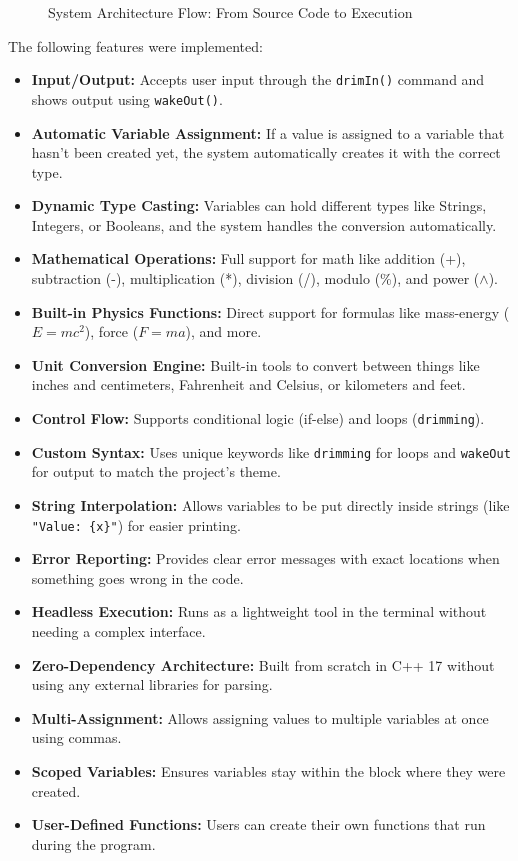 \documentclass[12pt, a4paper]{article}
\begin{document}
\begin{figure}[!h]
    \centering
    \caption{System Architecture Flow: From Source Code to Execution}
\end{figure}

The following features were implemented:
\begin{itemize}
    \item \textbf{Input/Output:} Accepts user input through the \texttt{drimIn()} command and shows output using \texttt{wakeOut()}.
    \item \textbf{Automatic Variable Assignment:} If a value is assigned to a variable that hasn't been created yet, the system automatically creates it with the correct type.
    \item \textbf{Dynamic Type Casting:} Variables can hold different types like Strings, Integers, or Booleans, and the system handles the conversion automatically.
    \item \textbf{Mathematical Operations:} Full support for math like addition (+), subtraction (-), multiplication (*), division (/), modulo (\%), and power ($\wedge$).
    \item \textbf{Built-in Physics Functions:} Direct support for formulas like mass-energy ($E=mc^2$), force ($F=ma$), and more.
    \item \textbf{Unit Conversion Engine:} Built-in tools to convert between things like inches and centimeters, Fahrenheit and Celsius, or kilometers and feet.
    \item \textbf{Control Flow:} Supports conditional logic (if-else) and loops (\texttt{drimming}).
    \item \textbf{Custom Syntax:} Uses unique keywords like \texttt{drimming} for loops and \texttt{wakeOut} for output to match the project's theme.
    \item \textbf{String Interpolation:} Allows variables to be put directly inside strings (like \texttt{"Value: \{x\}"}) for easier printing.
    \item \textbf{Error Reporting:} Provides clear error messages with exact locations when something goes wrong in the code.
    \item \textbf{Headless Execution:} Runs as a lightweight tool in the terminal without needing a complex interface.
    \item \textbf{Zero-Dependency Architecture:} Built from scratch in C++ 17 without using any external libraries for parsing.
    \item \textbf{Multi-Assignment:} Allows assigning values to multiple variables at once using commas.
    \item \textbf{Scoped Variables:} Ensures variables stay within the block where they were created.
    \item \textbf{User-Defined Functions:} Users can create their own functions that run during the program.
\end{itemize}
\end{document}
